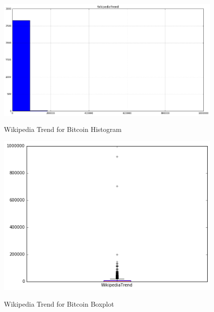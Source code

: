 \begin{figure}[bth]
  \myfloatalign
  {\includegraphics[width=1\linewidth]
    {gfx/wikipedia-trend-for-bitcoin-histogram}}
  \caption{Wikipedia Trend for Bitcoin
    Histogram}
  \label{fig:wikipedia-trend-for-bitcoin-histogram}
\end{figure}

\begin{figure}[bth]
  \myfloatalign
  {\includegraphics[width=1\linewidth]
    {gfx/wikipedia-trend-for-bitcoin-boxplot}}
  \caption{Wikipedia Trend for Bitcoin
    Boxplot}
  \label{fig:wikipedia-trend-for-bitcoin-boxplot}
\end{figure}

\clearpage





